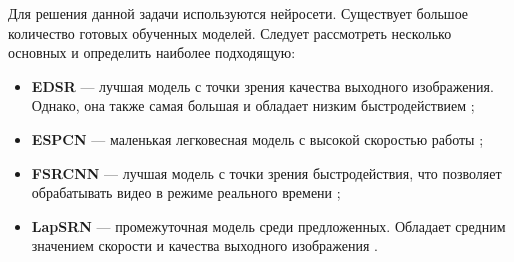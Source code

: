Для решения данной задачи используются нейросети. Существует большое количество готовых обученных моделей. Следует рассмотреть несколько основных и определить наиболее подходящую:
\begin{itemize}
	\item \textbf{EDSR} --- лучшая модель с точки зрения качества выходного изображения. Однако, она также самая большая и обладает низким быстродействием \cite{edsr};
	\item \textbf{ESPCN} --- маленькая легковесная модель с высокой скоростью работы \cite{espcn};
	\item \textbf{FSRCNN} --- лучшая модель с точки зрения быстродействия, что позволяет обрабатывать видео в режиме реального времени \cite{fsrcnn};
	\item \textbf{LapSRN} --- промежуточная модель среди предложенных. Обладает средним значением скорости и качества выходного изображения \cite{lapcsrn}.
\end{itemize}







